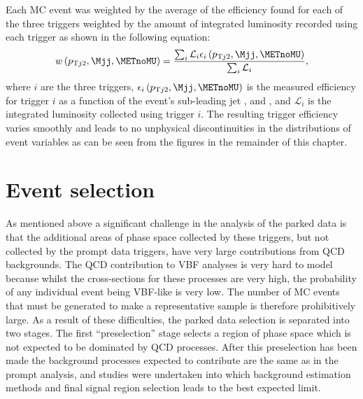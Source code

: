Each \ac{MC} event was weighted by the average of the efficiency found for each of the three triggers weighted by the amount of integrated luminosity recorded using each trigger as shown in the following equation:
\begin{equation}
  \label{eq:parkedtrigweight}
  w\left(p_{\mathrm{T}j2},\Mjj,\METnoMU\right)=\frac{\sum_{i}\mathcal{L}_{i}\epsilon_{i}\left(p_{\mathrm{T}j2},\Mjj,\METnoMU\right)}{\sum_{i}\mathcal{L}_{i}},
\end{equation}
where $i$ are the three triggers, $\epsilon_{i}\left(p_{\mathrm{T}j2},\Mjj,\METnoMU\right)$ is the measured efficiency for trigger $i$ as a function of the event's sub-leading jet \pt, \Mjj and \METnoMU, and $\mathcal{L}_{i}$ is the integrated luminosity collected using trigger $i$. The resulting trigger efficiency varies smoothly and leads to no unphysical discontinuities in the distributions of event variables as can be seen from the figures in the remainder of this chapter.

\section{Event selection}
\label{sec:parkedsel}
As mentioned above a significant challenge in the analysis of the parked data is that the additional areas of phase space collected by these triggers, but not collected by the prompt data triggers, have very large contributions from \ac{QCD} backgrounds. The \ac{QCD} contribution to \ac{VBF} analyses is very hard to model because whilst the cross-sections for these processes are very high, the probability of any individual event being \ac{VBF}-like is very low. The number of \ac{MC} events that must be generated to make a representative sample is therefore prohibitively large. As a result of these difficulties, the parked data selection is separated into two stages. The first ``preselection'' stage selects a region of phase space which is not expected to be dominated by \ac{QCD} processes. After this preselection has been made the background processes expected to contribute are the same as in the prompt analysis, and studies were undertaken into which background estimation methods and final signal region selection leads to the best expected limit.


